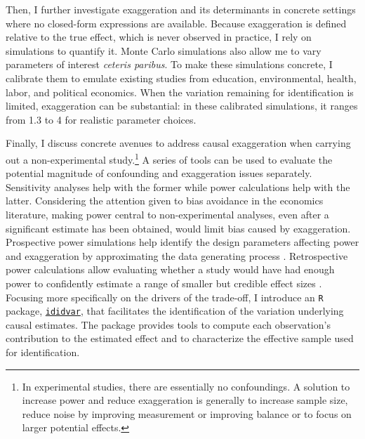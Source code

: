 			Then, I further investigate exaggeration and its determinants in concrete settings where no closed-form expressions are available. Because exaggeration is defined relative to the true effect, which is never observed in practice, I rely on simulations to quantify it. Monte Carlo simulations also allow me to vary parameters of interest \textit{ceteris paribus}. To make these simulations concrete, I calibrate them to emulate existing studies from education, environmental, health, labor, and political economics. When the variation remaining for identification is limited, exaggeration can be substantial: in these calibrated simulations, it ranges from 1.3 to 4 for realistic parameter choices.
			
			Finally, I discuss concrete avenues to address causal exaggeration when carrying out a non-experimental study.\footnote{In experimental studies, there are essentially no confoundings. A solution to increase power and reduce exaggeration is generally to increase sample size, reduce noise by improving measurement or improving balance or to focus on larger potential effects.} A series of tools can be used to evaluate the potential magnitude of confounding and exaggeration issues separately. Sensitivity analyses help with the former while power calculations help with the latter. %
			Considering the attention given to bias avoidance in the economics literature, making power central to non-experimental analyses, even after a significant estimate has been obtained, would limit bias caused by exaggeration. Prospective power simulations help identify the design parameters affecting power and exaggeration by approximating the data generating process \citep{gelman_regression_2020, black_simulated_2022}. Retrospective power calculations allow evaluating whether a study would have had enough power to confidently estimate a range of smaller but credible effect sizes \citep{gelman_beyond_2014, stommes_reliability_2023}.
			Focusing more specifically on the drivers of the trade-off, I introduce an \verb?R? package, \href{https://vincentbagilet.github.io/ididvar/}{\verb?ididvar?}, that facilitates the identification of the variation underlying causal estimates. The package provides tools to compute each observation’s contribution to the estimated effect and to characterize the effective sample used for identification.
						
